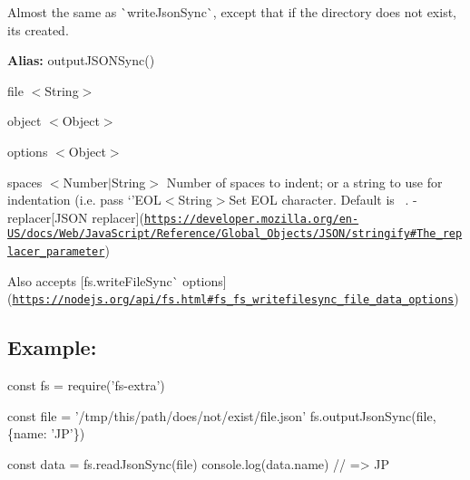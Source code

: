 Almost the same as \`{}write\+Json\+Sync\`{}, except that if the directory does not exist, it\textquotesingle{}s created.

{\bfseries Alias\+:} {\ttfamily output\+J\+S\+O\+N\+Sync()}


\begin{DoxyItemize}
\item {\ttfamily file} {\ttfamily $<$String$>$}
\item {\ttfamily object} {\ttfamily $<$Object$>$}
\item {\ttfamily options} {\ttfamily $<$Object$>$}
\begin{DoxyItemize}
\item {\ttfamily spaces} {\ttfamily $<$Number$\vert$\+String$>$} Number of spaces to indent; or a string to use for indentation (i.\+e. pass `'E\+O\+L$<$\+String$>${\ttfamily Set E\+OL character. Default is}~\newline
{\ttfamily . -\/}replacer{\ttfamily \mbox{[}J\+S\+ON replacer\mbox{]}(\href{https://developer.mozilla.org/en-US/docs/Web/JavaScript/Reference/Global_Objects/JSON/stringify#The_replacer_parameter}{\tt https\+://developer.\+mozilla.\+org/en-\/\+U\+S/docs/\+Web/\+Java\+Script/\+Reference/\+Global\+\_\+\+Objects/\+J\+S\+O\+N/stringify\#\+The\+\_\+replacer\+\_\+parameter})}
\item {\ttfamily Also accepts \mbox{[}}fs.\+write\+File\+Sync\`{} options\mbox{]}(\href{https://nodejs.org/api/fs.html#fs_fs_writefilesync_file_data_options}{\tt https\+://nodejs.\+org/api/fs.\+html\#fs\+\_\+fs\+\_\+writefilesync\+\_\+file\+\_\+data\+\_\+options})
\end{DoxyItemize}
\end{DoxyItemize}

\subsection*{Example\+:}


\begin{DoxyCode}
const fs = require('fs-extra')

const file = '/tmp/this/path/does/not/exist/file.json'
fs.outputJsonSync(file, \{name: 'JP'\})

const data = fs.readJsonSync(file)
console.log(data.name) // => JP
\end{DoxyCode}
 